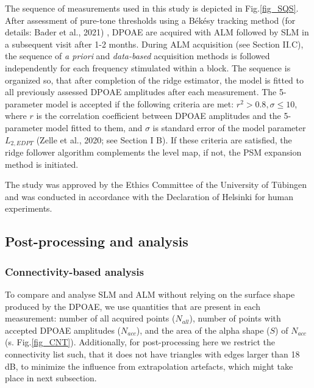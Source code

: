 \documentclass[journal,twoside,web]{ieeecolor2}
\begin{document}
The sequence of measurements used in this study is depicted in Fig.\ref{fig_SQS}.
After assessment of pure-tone thresholds using a Békésy tracking method (for details: Bader et al., 2021) , DPOAE are acquired with ALM followed by SLM in a subsequent visit after 1-2 months.
During ALM acquisition (see Section II.C), the sequence of \textit{a priori} and \textit{data-based} acquisition methods is followed independently for each frequency stimulated within a block.
The sequence is organized so, that after completion of the ridge estimator, the model is fitted to all previously assessed DPOAE amplitudes after each measurement.
The 5-parameter model is accepted if the following criteria are met: $r^2 > 0.8, \sigma \le 10$, where $r$ is the correlation coefficient between DPOAE amplitudes and the 5-parameter model fitted to them, and $\sigma $ is standard error of the model parameter $L_{2, EDPT}$ (Zelle et al., 2020; see Section I B).
If these criteria are satisfied, the ridge follower algorithm complements the level map, if not, the PSM expansion method is initiated.


The study was approved by the Ethics Committee of the University of Tübingen and   was conducted in accordance with the Declaration of Helsinki for human experiments.

\subsection{Post-processing and analysis}

\subsubsection{Connectivity-based analysis}
To compare and analyse SLM and ALM without relying on the surface shape produced by the DPOAE, we use quantities that are present in each measurement: number of all acquired points ($N_{all}$), number of points with accepted DPOAE amplitudes ($N_{acc}$), and the area of the alpha shape ($S$) of $N_{acc}$ (s. Fig.\ref{fig_CNT}).
Additionally, for post-processing here we restrict the connectivity list such, that it does not have triangles with edges larger than 18 dB, to minimize the influence from extrapolation artefacts, which might take place in next subsection.
\end{document}

